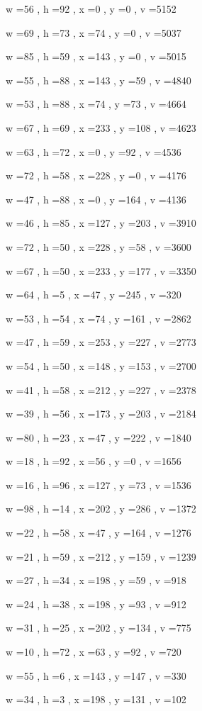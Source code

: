 \documentclass[11pt]{article}
\begin{document}
w =56 , h =92 , x =0 , y =0 , v =5152
\par
w =69 , h =73 , x =74 , y =0 , v =5037
\par
w =85 , h =59 , x =143 , y =0 , v =5015
\par
w =55 , h =88 , x =143 , y =59 , v =4840
\par
w =53 , h =88 , x =74 , y =73 , v =4664
\par
w =67 , h =69 , x =233 , y =108 , v =4623
\par
w =63 , h =72 , x =0 , y =92 , v =4536
\par
w =72 , h =58 , x =228 , y =0 , v =4176
\par
w =47 , h =88 , x =0 , y =164 , v =4136
\par
w =46 , h =85 , x =127 , y =203 , v =3910
\par
w =72 , h =50 , x =228 , y =58 , v =3600
\par
w =67 , h =50 , x =233 , y =177 , v =3350
\par
w =64 , h =5 , x =47 , y =245 , v =320
\par
w =53 , h =54 , x =74 , y =161 , v =2862
\par
w =47 , h =59 , x =253 , y =227 , v =2773
\par
w =54 , h =50 , x =148 , y =153 , v =2700
\par
w =41 , h =58 , x =212 , y =227 , v =2378
\par
w =39 , h =56 , x =173 , y =203 , v =2184
\par
w =80 , h =23 , x =47 , y =222 , v =1840
\par
w =18 , h =92 , x =56 , y =0 , v =1656
\par
w =16 , h =96 , x =127 , y =73 , v =1536
\par
w =98 , h =14 , x =202 , y =286 , v =1372
\par
w =22 , h =58 , x =47 , y =164 , v =1276
\par
w =21 , h =59 , x =212 , y =159 , v =1239
\par
w =27 , h =34 , x =198 , y =59 , v =918
\par
w =24 , h =38 , x =198 , y =93 , v =912
\par
w =31 , h =25 , x =202 , y =134 , v =775
\par
w =10 , h =72 , x =63 , y =92 , v =720
\par
w =55 , h =6 , x =143 , y =147 , v =330
\par
w =34 , h =3 , x =198 , y =131 , v =102
\par
\newpage
\end{document}

